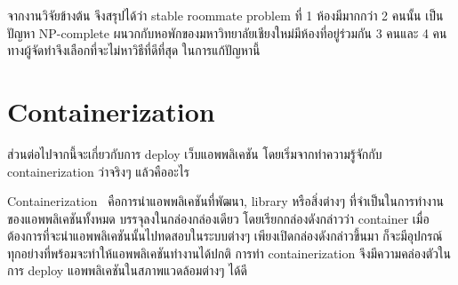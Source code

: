 

จากงานวิจัยข้างต้น จึงสรุปได้ว่า stable roommate problem ที่ 1 ห้องมีมากกว่า 2 คนนั้น
เป็นปัญหา NP-complete ผนวกกับหอพักของมหาวิทยาลัยเชียงใหม่มีห้องที่อยู่ร่วมกัน 3 คนและ 4 คน
ทางผู้จัดทำจึงเลือกที่จะไม่หาวิธีที่ดีที่สุด ในการแก้ปัญหานี้

\section{Containerization}
ส่วนต่อไปจากนี้จะเกี่ยวกับการ deploy เว็บแอพพลิเคชัน โดยเริ่มจากทำความรู้จักกับ 
containerization ว่าจริงๆ แล้วคืออะไร

Containerization~\cite{ctnrh} คือการนำแอพพลิเคชันที่พัฒนา, library หรือสิ่งต่างๆ ที่จำเป็นในการทำงานของแอพพลิเคชันทั้งหมด บรรจุลงในกล่องกล่องเดียว โดยเรียกกล่องดังกล่าวว่า container 
เมื่อต้องการที่จะนำแอพพลิเคชันนั้นไปทดสอบในระบบต่างๆ เพียงเปิดกล่องดังกล่าวขึ้นมา
ก็จะมีอุปกรณ์ทุกอย่างที่พร้อมจะทำให้แอพพลิเคชันทำงานได้ปกติ การทำ containerization 
จึงมีความคล่องตัวในการ deploy แอพพลิเคชันในสภาพแวดล้อมต่างๆ ได้ดี 





